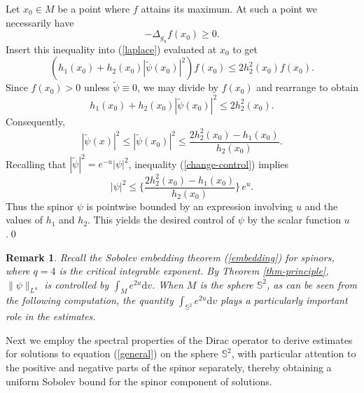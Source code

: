 \documentclass[a4paper, 12pt]{article}
\newtheorem{remark}[theorem]{Remark}
\begin{document}
Let \(x_0\in M\) be a point where \(f\) attains its maximum. At such a point we necessarily have
\[
-\Delta_{g_u} f\left( {{x_0}} \right) \ge 0.
\]
Insert this inequality into (\ref{laplace}) evaluated at \(x_0\) to get
\[
\left( {{h_1}\left( {{x_0}} \right) + {h_2}\left( {{x_0}} \right){{\left| {\tilde \psi \left( {{x_0}} \right)} \right|}^2}} \right)f\left( {{x_0}} \right) \leq 2 {h_2^2\left( {{x_0}} \right)} f\left( {{x_0}} \right).
\]
Since \(f\left( {{x_0}} \right)>0\) unless \(\tilde{\psi}\equiv0\), we may divide by \(f\left( {{x_0}} \right)\) and rearrange to obtain
\[
h_1\left( {{x_0}} \right)+h_2\left( {{x_0}} \right){\left| {\tilde \psi \left( {{x_0}} \right)} \right|}^2
\le 2h_2^2\left( {{x_0}} \right).
\]
Consequently,
\begin{equation}\label{change-control}
	{\left| {\tilde \psi \left( {{x}} \right)} \right|}^2\le {\left| {\tilde \psi \left( {{x_0}} \right)} \right|}^2
	\le \frac{2h_2^2\left( {{x_0}} \right)-h_1\left( {{x_0}} \right)}{h_2\left( {{x_0}} \right)}.
\end{equation}
Recalling that \(\left| {\tilde \psi } \right|^2 = e^{-u}\left| { \psi } \right|^2\), inequality (\ref{change-control}) implies
\begin{equation}\label{orig-control}
	\left| { \psi } \right|^2 \le
	\Biggl\{\frac{2h_2^2\left( {{x_0}} \right)-h_1\left( {{x_0}} \right)}{h_2\left( {{x_0}} \right)}\Biggr\}\,e^{u}.
\end{equation}
Thus the spinor \(\psi\) is pointwise bounded by an expression involving \(u\) and the values of \(h_1\) and \(h_2\). This yields the desired control of \(\psi\) by the scalar function \(u\).\qed
\begin{remark}
	Recall the Sobolev embedding theorem (\ref{embedding}) for spinors, where \(q=4\) is the critical integrable exponent. By Theorem \ref{thm-principle}, \(\|\psi\|_{L^4}\) is controlled by \(\int_M e^{2u}{\text{d}{v}}\). When \(M\) is the sphere \(\mathbb{S}^2\), as can be seen from the following computation, the quantity \(\int_{\mathbb{S}^2} e^{2u}{\text{d}{v}}\) plays a particularly important role in the estimates.
\end{remark}

Next we employ the spectral properties of the Dirac operator to derive estimates for solutions to equation (\ref{general}) on the sphere $\mathbb{S}^2$, with particular attention to the positive and negative parts of the spinor separately, thereby obtaining a uniform Sobolev bound for the spinor component of solutions.
\end{document}
